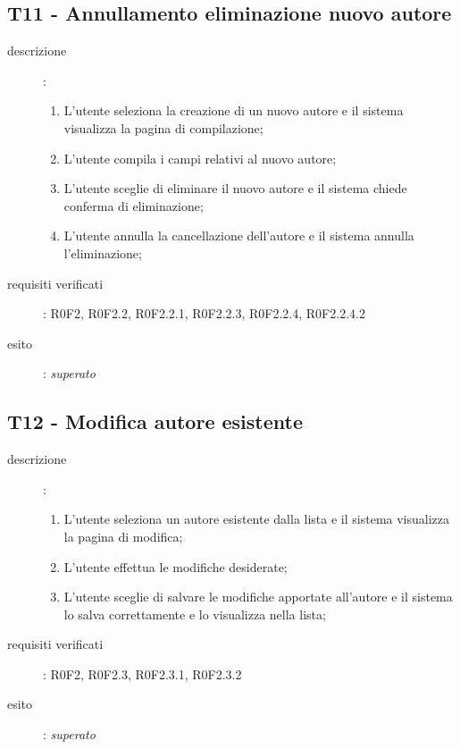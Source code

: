 \subsection{T11 - Annullamento eliminazione nuovo autore}
\begin{description}
\item[descrizione]: \hfill
	\begin{enumerate}
	\item L'utente seleziona la creazione di un nuovo autore e il sistema visualizza la pagina di compilazione;
	\item L'utente compila i campi relativi al nuovo autore;
	\item L'utente sceglie di eliminare il nuovo autore e il sistema chiede conferma di eliminazione;
	\item L'utente annulla la cancellazione dell'autore e il sistema annulla l'eliminazione;
	\end{enumerate}
\item[requisiti verificati]: R0F2, R0F2.2, R0F2.2.1, R0F2.2.3, R0F2.2.4, R0F2.2.4.2
\item[esito]: \emph{superato}
\end{description}

\subsection{T12 - Modifica autore esistente}
\begin{description}
\item[descrizione]: \hfill
	\begin{enumerate}
	\item L'utente seleziona un autore esistente dalla lista e il sistema visualizza la pagina di modifica;
	\item L'utente effettua le modifiche desiderate;
	\item L'utente sceglie di salvare le modifiche apportate all'autore e il sistema lo salva correttamente e lo visualizza nella lista;
	\end{enumerate}
\item[requisiti verificati]: R0F2, R0F2.3, R0F2.3.1, R0F2.3.2
\item[esito]: \emph{superato}
\end{description}

